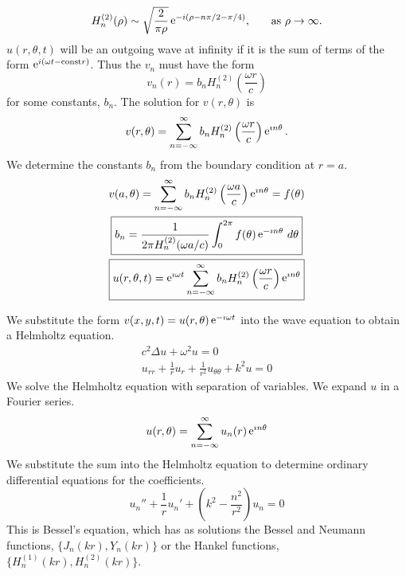 {\begin{Solution}
\begin{alignat*}{2}
    &H_n^{(2)}(\rho) \sim \sqrt{ \frac{2}{\pi\rho} } \mathop{\mathrm{e}}\nolimits^{-i(\rho- n \pi/2 - \pi/4)}
    ,\quad &\mathrm{as}\ \rho \to \infty.
  \end{alignat*}
  $u(r,\theta,t)$ will be an outgoing wave at infinity if it is the sum of 
  terms of the form $\mathop{\mathrm{e}}\nolimits^{i(\omega t - \mathrm{const} r)}$.  Thus the $v_n$
  must have the form
  \[
  v_n(r) = b_n H_n^{(2)} \left( \frac{\omega r}{c} \right)
  \]
  for some constants, $b_n$.  The solution for $v(r,\theta)$ is
  \[
  v(r, \theta) = \sum_{n = -\infty}^\infty b_n H_n^{(2)} \left( \frac{\omega r}{c} \right) 
  \mathop{\mathrm{e}}\nolimits^{\imath n \theta}.
  \]
  We determine the constants $b_n$ from the boundary condition at $r = a$.
  \begin{gather*}
    v(a, \theta) = \sum_{n = -\infty}^\infty b_n H_n^{(2)} \left( \frac{\omega a}{c} \right) 
    \mathop{\mathrm{e}}\nolimits^{\imath n \theta} = f(\theta) \\
    \boxed{
      b_n = \frac{1}{2 \pi H_n^{(2)} (\omega a/c)} \int_0^{2\pi} f(\theta)
      \mathop{\mathrm{e}}\nolimits^{-\imath n \theta} \,d\theta
      } \\
    \boxed{
      u(r, \theta, t) = \mathop{\mathrm{e}}\nolimits^{\imath \omega t}
      \sum_{n = -\infty}^\infty b_n H_n^{(2)} \left( \frac{\omega r}{c} \right) \mathop{\mathrm{e}}\nolimits^{\imath n \theta}
      }
  \end{gather*}
\end{Solution}















\begin{Solution}
  We substitute the form $v(x, y, t) = u(r, \theta) \mathop{\mathrm{e}}\nolimits^{-\imath \omega t}$ into
  the wave equation to obtain a Helmholtz equation.
  \begin{gather*}
    c^2 \Delta u + \omega^2 u = 0 \\
    u_{r r} + \frac{1}{r} u_r + \frac{1}{r^2} u_{\theta\theta} + k^2 u = 0
  \end{gather*}
  We solve the Helmholtz equation with separation of variables.  We expand
  $u$ in a Fourier series.
  \[
  u(r, \theta) = \sum_{n = -\infty}^\infty u_n(r) \mathop{\mathrm{e}}\nolimits^{\imath n \theta}
  \]
  We substitute the sum into the Helmholtz equation to determine ordinary 
  differential equations for the coefficients.
  \[
  u_n'' + \frac{1}{r} u_n' + \left( k^2 - \frac{n^2}{r^2} \right) u_n = 0
  \]
  This is Bessel's equation, which has as solutions the Bessel and Neumann
  functions, $\{ J_n(k r), Y_n(k r) \}$ or the Hankel functions,
  $\{ H_n^{(1)}(k r), H_n^{(2)}(k r) \}$.


\end{Solution}}

